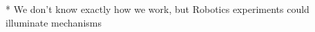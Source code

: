 \documentclass[11pt,a4paper]{report}
\begin{document}
* We don't know exactly how we work, but Robotics experiments could illuminate mechanisms

\end{document}
